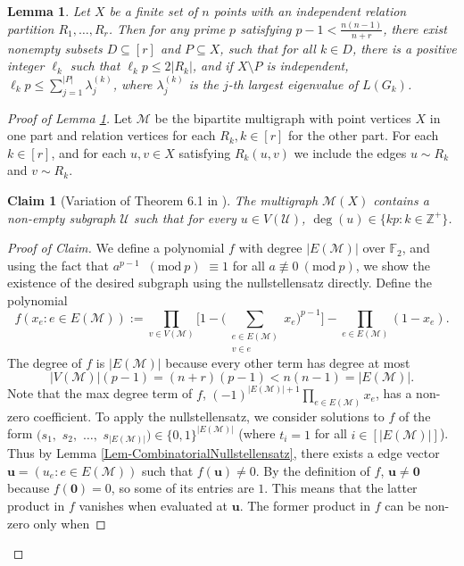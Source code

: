 \documentclass[12pt]{article}
\newcommand{\Z}{\mathbb{Z}}
\newcommand{\Mod}[1]{\ (\mathrm{mod}\ #1)}
\newtheorem{lem}{Lemma} %
\newtheorem*{claim}{Claim}
\theoremstyle{definition}
\begin{document}
	\begin{lem}\label{Lem-NullstellensatzEigenvalueInterlacing}
		Let $X$ be a finite set of $n$ points with an independent relation partition $R_1, \ldots, R_r$.  Then for any prime $p$ satisfying $p-1 < \tfrac{n(n-1)}{n+r}$, there exist nonempty subsets $D \subseteq [r]$ and $P \subseteq X$, such that for all $k \in D$, there is a positive integer $\ell_k$ such that $\ell_k p \leq 2|R_k|$, and if $X\setminus P$ is independent, $\ell_k p \leq \sum_{j =1}^{|P|}\lambda_j^{(k)}$,
		where $\lambda_j^{(k)}$ is the $j$-th largest eigenvalue of $L(G_k)$.
	\end{lem}
	\begin{proof}[Proof of Lemma \ref{Lem-NullstellensatzEigenvalueInterlacing}]
		Let $\mathcal{M}$ be the bipartite multigraph with point vertices $X$ in one part and relation vertices for each $R_k, k\in [r]$ for the other part.  For each $k \in [r]$, and for each $u,v \in X$ satisfying $R_k(u,v)$ we include the edges $u\sim R_k$ and $v \sim R_k$.
		\begin{claim}[Variation of Theorem 6.1 in \cite{alon}]\label{Prop-SubgraphNullstellensatzResult}
				The multigraph $\mathcal{M}(X)$ contains a non-empty subgraph $\mathcal{U}$ such that for every $u \in V(\mathcal{U})$, $\deg(u) \in \{kp: k \in \Z^+\}$.  %
		\end{claim}
			\begin{proof}[Proof of Claim]
				We define a polynomial $f$ with degree $|E(\mathcal{M})|$ over $\mathbb{F}_2$, and using the fact that $a^{p-1}$ $\Mod{p}$ $\equiv 1$ for all $a \not\equiv 0 \Mod{p}$, we show the existence of the desired subgraph using the nullstellensatz directly.
				Define the polynomial
				$$f(x_e:e \in E(\mathcal{M})) := \prod_{v \in V(\mathcal{M})} \biggr[1 - \Big(\sum_{\substack{e \in E(\mathcal{M})\\ v \in e}}x_e \Big)^{p-1} \biggr] - \prod_{e \in E(\mathcal{M})}(1-x_e).$$
				The degree of $f$ is $|E(\mathcal{M})|$ because every other term has degree at most
				$$|V(\mathcal{M})| (p-1) = (n+r)(p-1) < n(n-1) = |E(\mathcal{M})|.$$
				Note that the max degree term of $f$, $(-1)^{|E(\mathcal{M})|+1}\prod_{e \in E(\mathcal{M})} x_e$, has a non-zero coefficient. 
				To apply the nullstellensatz, we consider solutions to $f$ of the form $(s_1,$ $s_2,$ $\ldots,$ $s_{|E(\mathcal{M})|}) \in \{0,1\}^{|E(\mathcal{M})|}$ (where $t_i = 1$ for all $i \in [|E(\mathcal{M})|]$).  Thus by Lemma \ref{Lem-CombinatorialNullstellensatz}, there exists a edge vector $\mathbf{u}=(u_e:e \in E(\mathcal{M}))$ such that $f(\mathbf{u}) \neq 0$.  By the definition of $f$, $\mathbf{u} \neq \mathbf{0}$ because $f(\mathbf{0}) = 0$, so some of its entries are $1$.  This means that the latter product in $f$ vanishes when evaluated at $\mathbf{u}$.  The former product in $f$ can be non-zero only when

\end{proof}
\end{proof}
\end{document}
